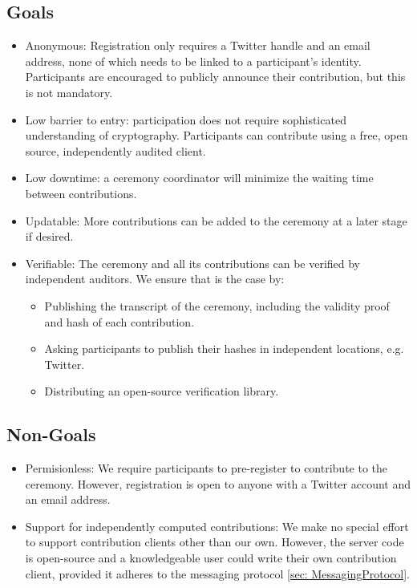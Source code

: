 
\subsection*{Goals}

\begin{itemize}
    \item Anonymous: Registration only requires a Twitter handle and an email address, none of which needs to be linked to a participant's identity. Participants are encouraged to publicly announce their contribution, but this is not mandatory.
    \item Low barrier to entry: participation does not require sophisticated understanding of cryptography. Participants can contribute using a free, open source, independently audited client.
    \item Low downtime: a ceremony coordinator will minimize the waiting time between contributions.
    \item Updatable: More contributions can be added to the ceremony at a later stage if desired.
    \item Verifiable: The ceremony and all its contributions can be verified by independent auditors. We ensure that is the case by:
    \begin{itemize}
        \item Publishing the transcript of the ceremony, including the validity proof and hash of each contribution.
        \item Asking participants to publish their hashes in independent locations, e.g. Twitter.
        \item Distributing an open-source verification library. 
    \end{itemize}
\end{itemize}

\subsection*{Non-Goals}

\begin{itemize}
    \item Permisionless: We require participants to pre-register to contribute to the ceremony. However, registration is open to anyone with a Twitter account and an email address.
    \item Support for independently computed contributions: We make no special effort to support contribution clients other than our own. However, the server code is open-source and a knowledgeable user could write their own contribution client, provided it adheres to the messaging protocol \ref{sec: MessagingProtocol}.
\end{itemize}